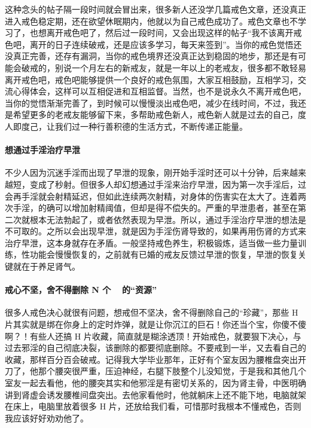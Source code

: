 这种念头的帖子隔一段时间就会冒出来，很多新人还没学几篇戒色文章，还没真正进入戒色稳定期，还在欲望休眠期内，他就以为自己戒色成功了。戒色文章也不学习了，也想离开戒色吧了，然后过一段时间，又会出现这样的帖子“我不该离开戒色吧，离开的日子连续破戒，还是应该多学习，每天来签到”。当你的戒色觉悟还没真正完善，还存有漏洞，当你的戒色境界还没真正达到稳固的地步，那还是有可能会破戒的，别说一个月左右的新戒友，就是一年以上的老戒友，很多都不敢轻易离开戒色吧，戒色吧能够提供一个良好的戒色氛围，大家互相鼓励，互相学习，交流心得体会，这样可以互相促进和互相监督。当然，也不是说永久不离开戒色吧，当你的觉悟渐渐完善了，到时候可以慢慢淡出戒色吧，减少在线时间，不过，我还是希望更多的老戒友能够留下来，多帮助戒色新人，戒色新人就是过去的自己，度人即度己，让我们过一种行善积德的生活方式，不断传递正能量。

\paragraph{想通过手淫治疗早泄}

不少人因为沉迷手淫而出现了早泄的现象，刚开始手淫时还可以十分钟，后来越来越短，变成了秒射。但很多人却幻想通过手淫来治疗早泄，因为第一次手淫后，过会再手淫就会射精延迟，但如此连续两次射精，对身体的伤害实在太大了。连着两次手淫，的确可以增加射精阈值，但却是得不偿失的。严重的早泄患者，甚至在第二次就根本无法勃起了，或者依然表现为早泄。所以，通过手淫治疗早泄的想法是不可取的。之所以会出现早泄，就是因为手淫伤肾导致的，如果再用伤肾的方式来治疗早泄，这本身就存在矛盾。一般坚持戒色养生，积极锻炼，适当做一些力量训练，性功能会慢慢恢复的，之前就有已婚的戒友反馈过早泄的恢复，早泄的恢复关键就在于养足肾气。

\paragraph{戒心不坚，舍不得删除 N 个 \unit{\giga\byte} 的“资源”}

很多人戒色决心就很有问题，想戒但不坚决，舍不得删除自己的“珍藏”，那些 H 片其实就是绑在你身上的定时炸弹，就是让你沉江的巨石！你还当个宝，你傻不傻啊？！有些人还搞 H 片收藏，简直就是糊涂透顶！开始戒色，就要狠下决心，与过去邪淫的自己彻底决裂，该删除的都要彻底删除。不要戒到一半，又去看自己的收藏，那样百分百会破戒。记得我大学毕业那年，正好有个室友因为腰椎盘突出开刀了，他那个腰突很严重，压迫神经，右腿下肢整个儿没知觉，于是我和其他几个室友一起去看他，他的腰突其实和他邪淫是有密切关系的，因为肾主骨，中医明确讲到肾虚会诱发腰椎间盘突出。去他家看他时，他就躺床上还不能下地，电脑就架在床上，电脑里放着很多 H 片，还放给我们看，可惜那时我根本不懂戒色，否则我应该好好劝劝他了。

